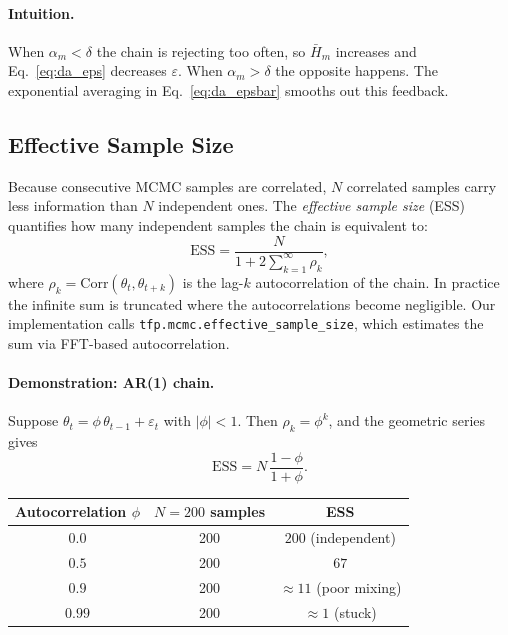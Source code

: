 \documentclass{article}
\begin{document}
\paragraph{Intuition.}
When $\alpha_m < \delta$ the chain is rejecting too often, so $\bar{H}_m$ increases and
Eq.~\eqref{eq:da_eps} decreases $\varepsilon$.  When $\alpha_m > \delta$ the opposite happens.
The exponential averaging in Eq.~\eqref{eq:da_epsbar} smooths out this feedback.

\subsection{Effective Sample Size}

Because consecutive MCMC samples are correlated, $N$ correlated samples carry less information
than $N$ independent ones.  The \emph{effective sample size} (ESS) quantifies how many
independent samples the chain is equivalent to:
\begin{equation}
  \mathrm{ESS} = \frac{N}{1 + 2\displaystyle\sum_{k=1}^{\infty} \rho_k},
\end{equation}
where $\rho_k = \mathrm{Corr}(\theta_t, \theta_{t+k})$ is the lag-$k$ autocorrelation of the
chain.  In practice the infinite sum is truncated where the autocorrelations become negligible.
Our implementation calls \texttt{tfp.mcmc.effective\_sample\_size}, which estimates the sum via
FFT-based autocorrelation.

\paragraph{Demonstration: AR(1) chain.}
Suppose $\theta_t = \phi\,\theta_{t-1} + \varepsilon_t$ with $|\phi| < 1$.  Then
$\rho_k = \phi^k$, and the geometric series gives
\begin{equation}
  \mathrm{ESS} = N\,\frac{1 - \phi}{1 + \phi}.
\end{equation}
\begin{center}
\begin{tabular}{ccc}
\toprule
Autocorrelation $\phi$ & $N = 200$ samples & ESS \\
\midrule
$0.0$ & 200 & $200$ \quad (independent) \\
$0.5$ & 200 & $67$ \\
$0.9$ & 200 & $\approx 11$ \quad (poor mixing) \\
$0.99$ & 200 & $\approx 1$ \quad (stuck) \\
\bottomrule
\end{tabular}
\end{center}
\end{document}

